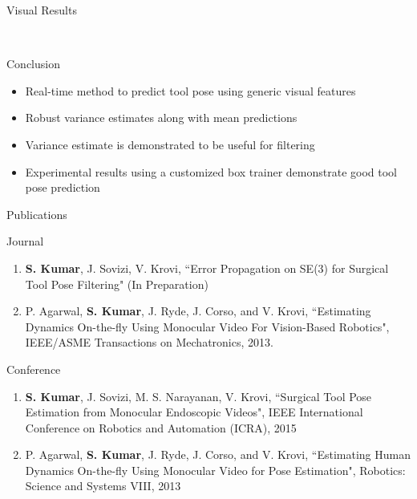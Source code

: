 \begin{frame}{Visual Results}
\begin{figure}
\\
\end{figure}

\end{frame}

\begin{frame}{Conclusion}
\begin{itemize}
\item Real-time method to predict tool pose using generic visual features
\item Robust variance estimates along with mean predictions
\item Variance estimate is demonstrated to be useful for filtering
\item Experimental results using a customized box trainer demonstrate good tool pose prediction 
\end{itemize}
\end{frame}

\begin{frame}{Publications}
\begin{block}{Journal}
\begin{enumerate}
\item \textbf{S. Kumar}, J. Sovizi, V. Krovi, ``Error Propagation on SE(3) for Surgical Tool Pose Filtering" (In Preparation)
\item P. Agarwal, \textbf{S. Kumar}, J. Ryde, J. Corso, and V. Krovi, ``Estimating Dynamics On-the-fly Using Monocular Video For Vision-Based Robotics", IEEE/ASME Transactions on Mechatronics, 2013.
\end{enumerate}
\end{block}

\begin{block}{Conference}
\begin{enumerate}
\item \textbf{S. Kumar}, J. Sovizi, M. S. Narayanan, V. Krovi, ``Surgical Tool Pose Estimation from Monocular Endoscopic Videos", IEEE International Conference on Robotics and Automation (ICRA), 2015
\item P. Agarwal, \textbf{S. Kumar}, J. Ryde, J. Corso, and V. Krovi,
``Estimating Human Dynamics On-the-fly Using Monocular Video for Pose
Estimation", Robotics: Science and Systems VIII, 2013
\end{enumerate}
\end{block}
\end{frame}




